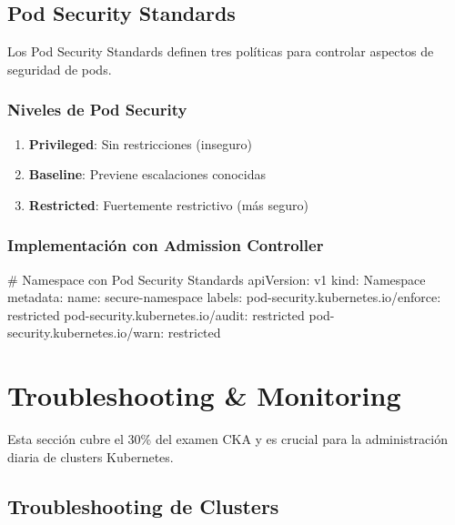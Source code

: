 \documentclass[11pt,a4paper]{article}
\begin{document}
\subsection{Pod Security Standards}

Los Pod Security Standards definen tres políticas para controlar aspectos de seguridad de pods.

\subsubsection{Niveles de Pod Security}

\begin{enumerate}
    \item \textbf{\textcolor{k8ssuccess}{Privileged}}: Sin restricciones (inseguro)
    \item \textbf{\textcolor{k8swarning}{Baseline}}: Previene escalaciones conocidas
    \item \textbf{\textcolor{k8serror}{Restricted}}: Fuertemente restrictivo (más seguro)
\end{enumerate}

\subsubsection{Implementación con Admission Controller}

\begin{commandbox}
\# Namespace con Pod Security Standards
apiVersion: v1
kind: Namespace
metadata:
  name: secure-namespace
  labels:
    pod-security.kubernetes.io/enforce: restricted
    pod-security.kubernetes.io/audit: restricted
    pod-security.kubernetes.io/warn: restricted
\end{commandbox}

\newpage

\section{Troubleshooting \& Monitoring}

\begin{infobox}
Esta sección cubre el 30\% del examen CKA y es crucial para la administración diaria de clusters Kubernetes.
\end{infobox}

\subsection{Troubleshooting de Clusters}
\end{document}
